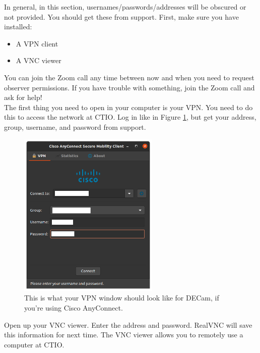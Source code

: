 In general, in this section, usernames/passwords/addresses will be obscured or not provided. You should get these from support. First, make sure you have installed:
\begin{itemize}
    \item A VPN client
    \item A VNC viewer
\end{itemize}

You can join the Zoom call any time between now and when you need to request observer permissions. If you have trouble with something, join the Zoom call and ask for help! \\

The first thing you need to open in your computer is your VPN. You need to do this to access the network at CTIO. Log in like in Figure \ref{fig:vpn}, but get your address, group, username, and password from support. \\

\begin{figure}[h!]
    \centering
    \includegraphics[width=0.6\textwidth]{figs/observing/vpn.png}
    \caption{This is what your VPN window should look like for DECam, if you're using Cisco AnyConnect.}
    \label{fig:vpn}
\end{figure}

Open up your VNC viewer. Enter the address and password. RealVNC will save this information for next time. The VNC viewer allows you to remotely use a computer at CTIO. \\

